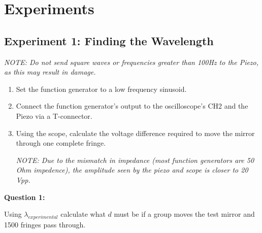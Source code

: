 
\section{Experiments}
	\subsection{Experiment 1: Finding the Wavelength}

\emph{NOTE: Do not send square waves or frequencies greater than 100Hz
to the Piezo, as this may result in damage.}

\begin{enumerate}
 	\item Set the function generator to a low frequency sinusoid.
	\item Connect the function generator's output to the oscilloscope's CH2
        and the Piezo via a T-connector.
	\item Using the scope, calculate the voltage difference required
		  to move the mirror through one complete fringe.

	\emph{NOTE: Due to the mismatch in impedance (most function generators
		are 50 Ohm impedence), the amplitude seen by the piezo and scope is closer to 20 Vpp.}

\end{enumerate}

\textbf{Question 1:}
	
	\indent Using $\lambda_{experimental}$ calculate what $d$ must be
	if a group moves the test mirror and 1500 fringes pass through.


